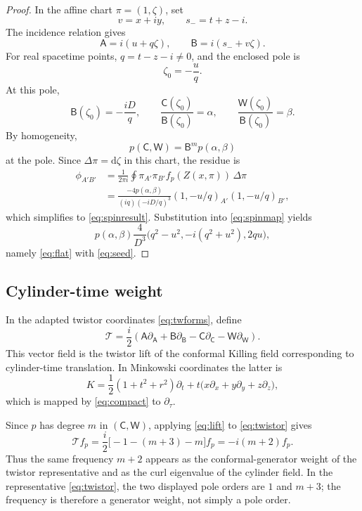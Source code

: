 \documentclass[11pt,a4paper]{article}
\numberwithin{equation}{section}
\theoremstyle{remark}
\newcommand{\dd}{\mathrm{d}}
\newcommand{\cT}{\mathcal{T}}
\begin{document}
\begin{proof}
In the affine chart \(\pi=(1,\zeta)\), set
\[
 v=x+iy,
 \qquad
 s_-=t+z-i.
\]
The incidence relation gives
\begin{equation}
 \mathsf A=i(u+q\zeta),
 \qquad
 \mathsf B=i(s_-+v\zeta).
\end{equation}
For real spacetime points, \(q=t-z-i\neq0\), and the enclosed pole is
\[
 \zeta_0=-\frac{u}{q}.
\]
At this pole,
\begin{equation}\label{eq:ratios}
 \mathsf B(\zeta_0)=-\frac{iD}{q},
 \qquad
 \frac{\mathsf C(\zeta_0)}{\mathsf B(\zeta_0)}=\alpha,
 \qquad
 \frac{\mathsf W(\zeta_0)}{\mathsf B(\zeta_0)}=\beta.
\end{equation}
By homogeneity,
\[
 p(\mathsf C,\mathsf W)
 =\mathsf B^m p(\alpha,\beta)
\]
at the pole. Since \(\Delta\pi=\dd\zeta\) in this chart, the residue is
\begin{align}
 \phi_{A'B'}
 &=\frac1{2\pi i}\oint
 \pi_{A'}\pi_{B'}f_p(Z(x,\pi))\,\Delta\pi\nonumber\\
 &=\frac{-4p(\alpha,\beta)}{(iq)(-iD/q)^3}
 (1,-u/q)_{A'}(1,-u/q)_{B'},
\end{align}
which simplifies to \eqref{eq:spinresult}. Substitution into \eqref{eq:spinmap} yields
\[
 p(\alpha,\beta)\frac{4}{D^3}
 \bigl(q^2-u^2,-i(q^2+u^2),2qu\bigr),
\]
namely \eqref{eq:flat} with \eqref{eq:seed}.
\end{proof}

\subsection{Cylinder-time weight}

In the adapted twistor coordinates \eqref{eq:twforms}, define
\begin{equation}\label{eq:lift}
 \cT=\frac{i}{2}
 \left(
 \mathsf A\partial_{\mathsf A}
 +\mathsf B\partial_{\mathsf B}
 -\mathsf C\partial_{\mathsf C}
 -\mathsf W\partial_{\mathsf W}
 \right).
\end{equation}
This vector field is the twistor lift of the conformal Killing field corresponding to cylinder-time translation. In Minkowski coordinates the latter is
\begin{equation}\label{eq:K}
 K=\frac12(1+t^2+r^2)\partial_t
 +t\bigl(x\partial_x+y\partial_y+z\partial_z\bigr),
\end{equation}
which is mapped by \eqref{eq:compact} to \(\partial_\tau\).

Since \(p\) has degree \(m\) in \((\mathsf C,\mathsf W)\), applying \eqref{eq:lift} to \eqref{eq:twistor} gives
\begin{equation}\label{eq:weight}
 \cT f_p
 =\frac{i}{2}\bigl[-1-(m+3)-m\bigr]f_p
 =-i(m+2)f_p.
\end{equation}
Thus the same frequency \(m+2\) appears as the conformal-generator weight of the twistor representative and as the curl eigenvalue of the cylinder field. In the representative \eqref{eq:twistor}, the two displayed pole orders are \(1\) and \(m+3\); the frequency is therefore a generator weight, not simply a pole order.
\end{document}
